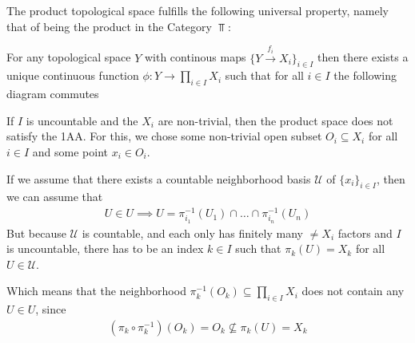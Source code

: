 The product topological space fulfills the following universal property, namely that of being the product in the Category $\Top$:

For any topological space $Y$ with continous maps $\{Y \stackrel{f_i}{\to}X_i\}_{i \in I}$ then there exists a unique continuous function $\phi: Y \to  \prod_{i \in I}X_i$ such that for all $i \in I$ the following diagram commutes

\begin{center}
\end{center}


\begin{ex}[]
If $I$ is uncountable and the $X_i$ are non-trivial, then the product space does not satisfy the 1AA.
For this, we chose some non-trivial open subset $O_i \subseteq X_i$ for all $i \in I$ and some point $x_i \in O_i$.

If we assume that there exists a countable neighborhood basis $\mathcal{U}$ of $\{x_i\}_{i \in I}$, then we can assume that
\begin{align*}
  U \in U \implies U = \pi_{i_1}^{-1}(U_1) \cap \ldots \cap \pi_{i_n}^{-1}(U_n)
\end{align*}
But because $\mathcal{U}$ is countable, and each only has finitely many $\neq X_i$ factors and $I$ is uncountable,
there has to be an index $k \in I$ such that $\pi_k(U) = X_k$ for all $U \in \mathcal{U}$.

Which means that the neighborhood $\pi_k^{-1}(O_k) \subseteq \prod_{i \in I}X_i$ does not contain any $U \in U$, since
\begin{align*}
  (\pi_k \circ \pi_k^{-1})(O_k) = O_k \nsubseteq \pi_k(U) = X_k
\end{align*}

\end{ex}
